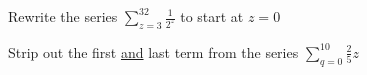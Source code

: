 \documentclass[addpoints]{exam}
\begin{document}
\begin{tcolorbox}[breakable, title=SERIES, colframe=black, sharp corners, colback=white, colbacktitle=white, coltitle=black]
          \vspace{0.1in}
          \noindent\makebox[\linewidth]{\hrulefill}
          \begin{questions}
            \begin{minipage}{0.45\linewidth}
              \question Rewrite the series $\sum\limits_{z=3}^{32} \frac{1}{2^z}$ to start at $z=0$
            \end{minipage}
            \hfill 
            \begin{minipage}{0.45\linewidth}
              \question Strip out the first \underline{and} last term from the series $\sum\limits_{q=0}^{10} \frac{2}{5}z$
              \end{minipage}
            \vspace{1.6in}
          \end{questions}
    \end{tcolorbox}
\end{document}
